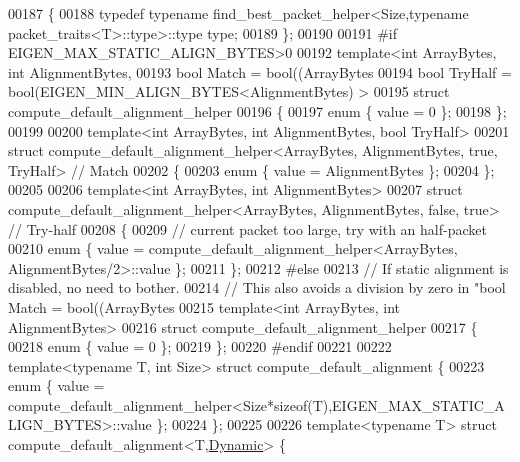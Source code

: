 \begin{DoxyCode}
00187 \{
00188   \textcolor{keyword}{typedef} \textcolor{keyword}{typename} find\_best\_packet\_helper<Size,typename packet\_traits<T>::type>::type type;
00189 \};
00190 
00191 \textcolor{preprocessor}{#if EIGEN\_MAX\_STATIC\_ALIGN\_BYTES>0}
00192 \textcolor{keyword}{template}<\textcolor{keywordtype}{int} ArrayBytes, \textcolor{keywordtype}{int} AlignmentBytes,
00193          \textcolor{keywordtype}{bool} Match     =  bool((ArrayBytes%
00194          \textcolor{keywordtype}{bool} TryHalf   =  bool(EIGEN\_MIN\_ALIGN\_BYTES<AlignmentBytes) >
00195 \textcolor{keyword}{struct }compute\_default\_alignment\_helper
00196 \{
00197   \textcolor{keyword}{enum} \{ value = 0 \};
00198 \};
00199 
00200 \textcolor{keyword}{template}<\textcolor{keywordtype}{int} ArrayBytes, \textcolor{keywordtype}{int} AlignmentBytes, \textcolor{keywordtype}{bool} TryHalf>
00201 \textcolor{keyword}{struct }compute\_default\_alignment\_helper<ArrayBytes, AlignmentBytes, true, TryHalf> \textcolor{comment}{// Match}
00202 \{
00203   \textcolor{keyword}{enum} \{ value = AlignmentBytes \};
00204 \};
00205 
00206 \textcolor{keyword}{template}<\textcolor{keywordtype}{int} ArrayBytes, \textcolor{keywordtype}{int} AlignmentBytes>
00207 \textcolor{keyword}{struct }compute\_default\_alignment\_helper<ArrayBytes, AlignmentBytes, false, true> \textcolor{comment}{// Try-half}
00208 \{
00209   \textcolor{comment}{// current packet too large, try with an half-packet}
00210   \textcolor{keyword}{enum} \{ value = compute\_default\_alignment\_helper<ArrayBytes, AlignmentBytes/2>::value \};
00211 \};
00212 \textcolor{preprocessor}{#else}
00213 \textcolor{comment}{// If static alignment is disabled, no need to bother.}
00214 \textcolor{comment}{// This also avoids a division by zero in "bool Match =  bool((ArrayBytes%
00215 \textcolor{keyword}{template}<\textcolor{keywordtype}{int} ArrayBytes, \textcolor{keywordtype}{int} AlignmentBytes>
00216 \textcolor{keyword}{struct }compute\_default\_alignment\_helper
00217 \{
00218   \textcolor{keyword}{enum} \{ value = 0 \};
00219 \};
00220 \textcolor{preprocessor}{#endif}
00221 
00222 \textcolor{keyword}{template}<\textcolor{keyword}{typename} T, \textcolor{keywordtype}{int} Size> \textcolor{keyword}{struct }compute\_default\_alignment \{
00223   \textcolor{keyword}{enum} \{ value = compute\_default\_alignment\_helper<Size*sizeof(T),EIGEN\_MAX\_STATIC\_ALIGN\_BYTES>::value \};
00224 \};
00225 
00226 \textcolor{keyword}{template}<\textcolor{keyword}{typename} T> \textcolor{keyword}{struct }compute\_default\_alignment<T,\hyperlink{namespace_eigen_ad81fa7195215a0ce30017dfac309f0b2}{Dynamic}> \{
}
\end{DoxyCode}
